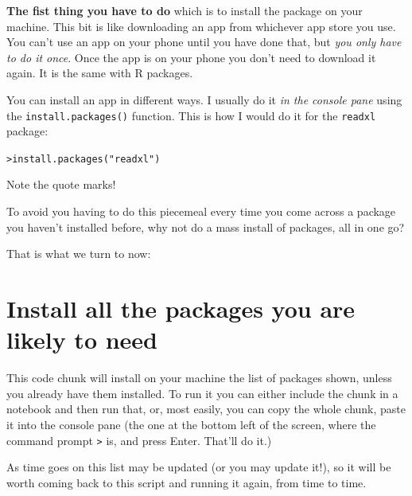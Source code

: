 \documentclass[
  letterpaper,
  DIV=11,
  numbers=noendperiod]{scrreprt}
\begin{document}
\textbf{The fist thing you have to do} which is to install the package
on your machine. This bit is like downloading an app from whichever app
store you use. You can't use an app on your phone until you have done
that, but \emph{you only have to do it once}. Once the app is on your
phone you don't need to download it again. It is the same with R
packages.

You can install an app in different ways. I usually do it \emph{in the
console pane} using the \texttt{install.packages()} function. This is
how I would do it for the \texttt{readxl} package:

\texttt{\textgreater{}install.packages("readxl")}

Note the quote marks!

To avoid you having to do this piecemeal every time you come across a
package you haven't installed before, why not do a mass install of
packages, all in one go?

That is what we turn to now:

\section{Install all the packages you are likely to
need}\label{install-all-the-packages-you-are-likely-to-need}

This code chunk will install on your machine the list of packages shown,
unless you already have them installed. To run it you can either include
the chunk in a notebook and then run that, or, most easily, you can copy
the whole chunk, paste it into the console pane (the one at the bottom
left of the screen, where the command prompt \texttt{\textgreater{}} is,
and press Enter. That'll do it.)

As time goes on this list may be updated (or you may update it!), so it
will be worth coming back to this script and running it again, from time
to time.
\end{document}
